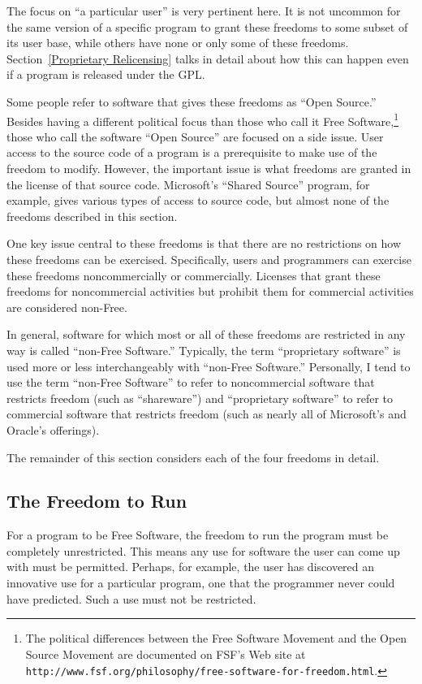 \documentclass[11pt, letterpaper]{book}
\begin{document}
The focus on ``a particular user'' is very pertinent here. It is not
uncommon for the same version of a specific program to grant these
freedoms to some subset of its user base, while others have none or only
some of these freedoms. Section~\ref{Proprietary Relicensing} talks in
detail about how this can happen even if a program is released under the
GPL\@.

Some people refer to software that gives these freedoms as ``Open
Source.''  Besides having a different political focus than those who
call it Free Software,\footnote{The political differences between the
  Free Software Movement and the Open Source Movement are documented
  on FSF's Web site at {\tt
    http://www.fsf.org/philosophy/free-software-for-freedom.html}.}
those who call the software ``Open Source'' are focused on a side
issue.  User access to the source code of a program is a prerequisite
to make use of the freedom to modify. However, the important issue is
what freedoms are granted in the license of that source code.
Microsoft's ``Shared Source'' program, for example, gives various
types of access to source code, but almost none of the freedoms
described in this section.

One key issue central to these freedoms is that there are no
restrictions on how these freedoms can be exercised. Specifically, users
and programmers can exercise these freedoms noncommercially or
commercially. Licenses that grant these freedoms for noncommercial
activities but prohibit them for commercial activities are considered
non-Free.

In general, software for which most or all of these freedoms are
restricted in any way is called ``non-Free Software.''  Typically, the
term ``proprietary software'' is used more or less interchangeably with
``non-Free Software.''  Personally, I tend to use the term ``non-Free
Software'' to refer to noncommercial software that restricts freedom
(such as ``shareware'') and ``proprietary software'' to refer to
commercial software that restricts freedom (such as nearly all of
Microsoft's and Oracle's offerings).

The remainder of this section considers each of the four freedoms in
detail.

\subsection{The Freedom to Run}

For a program to be Free Software, the freedom to run the program must
be completely unrestricted. This means any use for software the user
can come up with must be permitted. Perhaps, for example, the user
has discovered an innovative use for a particular program, one
that the programmer never could have predicted. Such a use must not
be restricted.
\end{document}
